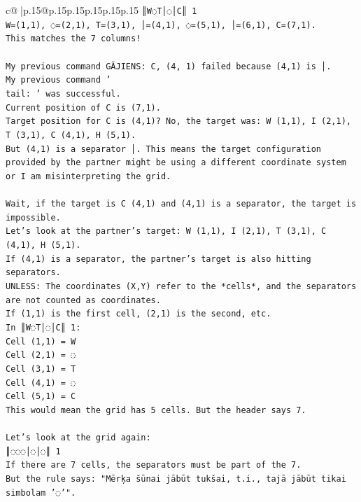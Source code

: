 \documentclass{article}
\begin{document}
{\begin{supertabular}{c@{$\;$}|p{.15\linewidth}@{}p{.15\linewidth}p{.15\linewidth}p{.15\linewidth}p{.15\linewidth}p{.15\linewidth}}
{{{\texttt{║W◌T│◌│C║ 1} \\
\texttt{W=(1,1), ◌=(2,1), T=(3,1), │=(4,1), ◌=(5,1), │=(6,1), C=(7,1).} \\
\texttt{This matches the 7 columns!} \\
\\ 
\texttt{My previous command GĀJIENS: C, (4, 1) failed because (4,1) is │.} \\
\texttt{My previous command '} \\
\texttt{tail: ' was successful.} \\
\texttt{Current position of C is (7,1).} \\
\texttt{Target position for C is (4,1)? No, the target was: W (1,1), I (2,1), T (3,1), C (4,1), H (5,1).} \\
\texttt{But (4,1) is a separator │. This means the target configuration provided by the partner might be using a different coordinate system or I am misinterpreting the grid.} \\
\\ 
\texttt{Wait, if the target is C (4,1) and (4,1) is a separator, the target is impossible.} \\
\texttt{Let's look at the partner's target: W (1,1), I (2,1), T (3,1), C (4,1), H (5,1).} \\
\texttt{If (4,1) is a separator, the partner's target is also hitting separators.} \\
\texttt{UNLESS: The coordinates (X,Y) refer to the *cells*, and the separators are not counted as coordinates.} \\
\texttt{If (1,1) is the first cell, (2,1) is the second, etc.} \\
\texttt{In ║W◌T│◌│C║ 1:} \\
\texttt{Cell (1,1) = W} \\
\texttt{Cell (2,1) = ◌} \\
\texttt{Cell (3,1) = T} \\
\texttt{Cell (4,1) = ◌} \\
\texttt{Cell (5,1) = C} \\
\texttt{This would mean the grid has 5 cells. But the header says 7.} \\
\\ 
\texttt{Let's look at the grid again:} \\
\texttt{║◌◌◌│◌│◌║ 1} \\
\texttt{If there are 7 cells, the separators must be part of the 7.} \\
\texttt{But the rule says: "Mērķa šūnai jābūt tukšai, t.i., tajā jābūt tikai simbolam '◌'".} \\
}}}
\end{supertabular}}
\end{document}
